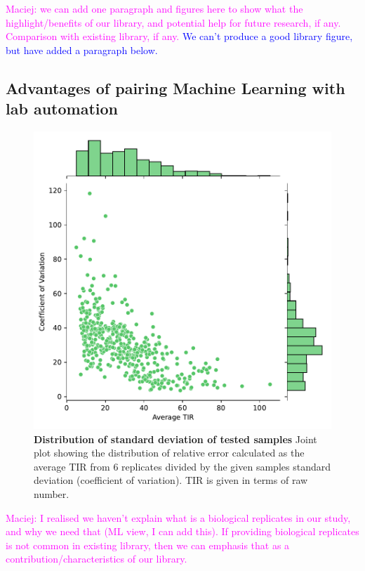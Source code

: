 \documentclass{article}
\newcommand{\mengyan}[1]{\textcolor{magenta}{#1}}
\newcommand{\maciej}[1]{\textcolor{blue}{#1}}
\begin{document}
\mengyan{Maciej: we can add one paragraph and figures here to show what the highlight/benefits of our library, and potential help for future research, if any. Comparison with existing library, if any.} \maciej{We can't produce a good library figure, but have added a paragraph below.}

\subsection{Advantages of pairing Machine Learning with lab automation}

\begin{figure}[!ht]
    \centering
    \includegraphics[scale=0.75]{plots/Main_Paper/SD.pdf}
    \caption{\textbf{Distribution of standard deviation of tested samples} Joint plot showing the distribution of relative error calculated as the average TIR from 6 replicates divided by the given samples standard deviation (coefficient of variation). TIR is given in terms of raw number.}
    \label{fig: SD}
\end{figure}

\mengyan{Maciej: I realised we haven't explain what is a biological replicates in our study, and why we need that (ML view, I can add this). If providing biological replicates is not common in existing library, then we can emphasis that as a contribution/characteristics of our library.}
\end{document}
